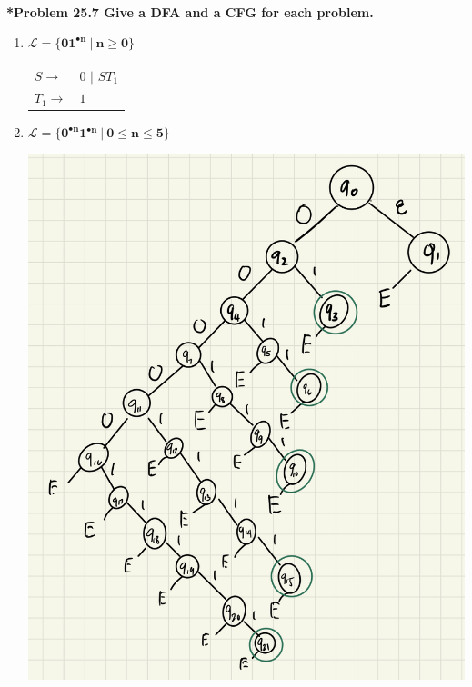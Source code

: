 \documentclass{article}
\begin{document}
    \noindent\\[0.25in]
    \noindent\textbf{*Problem 25.7 Give a DFA and a CFG for each problem.}
    \begin{enumerate}[label=(\alph*)]
        \item $\mathbf{\mathcal{L}=\{01^{\bullet n}\ |\ n\ge 0\}}$
        \begin{center}

            \begin{tabular}{l l}
                $S \rightarrow$ & $0$ $|$ $ST_1$\\
                $T_1 \rightarrow$ & $1$
            \end{tabular}
        \end{center}
        \item $\mathbf{\mathcal{L}=\{0^{\bullet n}1^{\bullet n}\ |\ 0\le n\le 5\}}$
        \begin{center}
            \includegraphics[scale=0.5]{p25_7b.jpg}


\end{center}
\end{enumerate}
\end{document}
